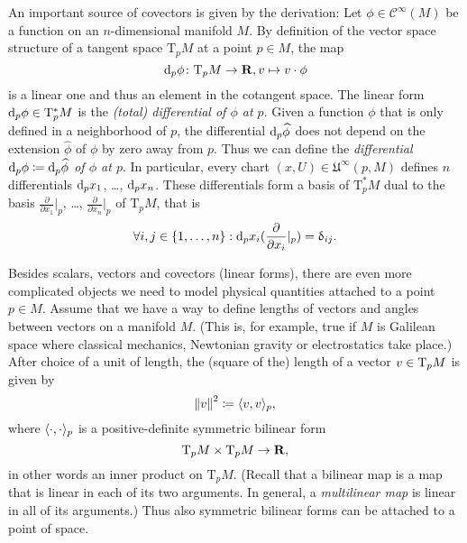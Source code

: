 An important source of covectors is given by the derivation: Let $\phi \in \mathcal
C^\infty(M)$ be a function on an $n$-dimensional manifold $M$. By definition 
of the vector space structure of a tangent space $\mathrm T_p M$ at a point $p \in M$,
the map
\[
  \mathrm d_p \phi\colon \mathrm T_p M \to \mathbf{R},
  v \mapsto v \cdot \phi
\]
is a linear one and thus an element in the cotangent space. The linear form
$\mathrm d_p \phi \in \mathrm T^*_p M$ is the \emph{(total) differential of $\phi$ at
$p$}. Given a function $\phi$ that is only defined in a neighborhood of $p$, the
differential $\mathrm d_p \widehat\phi$ does not depend on the extension $\widehat \phi$
of $\phi$ by zero away from $p$. Thus we can define the \emph{differential
$\mathrm d_p \phi \coloneqq \mathrm d_p \widehat \phi$ of $\phi$ at $p$}. In particular,
every chart $(x, U) \in \mathfrak U^\infty(p, M)$ defines $n$ differentials
$\mathrm d_p x_1$, \dots, $\mathrm d_p x_n$. These differentials form a basis of
$\mathrm T^*_p M$ dual to the basis $\frac{\partial}{\partial x_1}|_p$, \dots,
$\frac{\partial}{\partial x_n}|_p$ of $\mathrm T_p M$, that is
\[
  \forall i, j \in \lbrace1, \dotsc, n\rbrace:
  \mathrm d_p x_i(\frac{\partial}{\partial x_i}|_p) = \updelta_{ij}.
\]

Besides scalars, vectors and covectors (linear forms), there are even more
complicated objects we need to model physical quantities attached to a point
$p \in M$. Assume that we have a way to define lengths of vectors and angles
between vectors on a manifold $M$. (This is, for example, true if $M$ is
Galilean space where classical mechanics, Newtonian gravity or electrostatics
take place.) After choice of a unit of length, the (square of the)
length of a vector $v \in \mathrm T_p M$ is given by
\[
  {\lVert v\rVert}^2 \coloneqq \langle v, v\rangle_p,
\]
where $\langle\cdot, \cdot\rangle_p$ is a positive-definite symmetric bilinear form
\[
  \mathrm T_p M \times \mathrm T_p M \to \mathbf{R},
\]
in other words an inner product on $\mathrm T_p M$. (Recall that a bilinear map
is a map that is linear in each of its two arguments. In general, a \emph{multilinear
map} is linear in all of its arguments.) Thus also symmetric bilinear
forms can be attached to a point of space.

